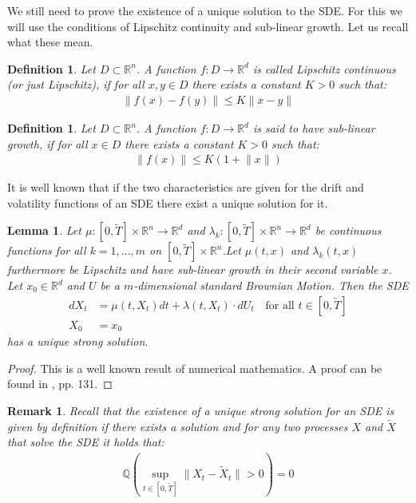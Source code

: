 \documentclass[12pt]{article}
\newtheorem{lemma}[theorem]{Lemma}
\newtheorem{remark}[theorem]{Remark}
\newtheorem{definition}[theorem]{Definition}
\begin{document}
	We still need to prove the existence of a unique solution to the SDE. For this we will use the conditions of Lipschitz continuity and sub-linear growth. Let us recall what these mean.
	\begin{definition}
		Let $D\subset \mathbb{R}^n$. A function $f: D \rightarrow \mathbb{R}^d$ is called Lipschitz continuous (or just Lipschitz), if for all $x, y\in D$ there exists a constant $K>0$ such that:
		\begin{align*}
			\lVert f(x) - f(y)\rVert \le K \lVert x - y\rVert
		\end{align*}
	\end{definition}
	\begin{definition}
		Let $D\subset \mathbb{R}^n$. A function $f: D \rightarrow \mathbb{R}^d$ is said to have \emph{sub-linear growth}, if for all $x\in D$ there exists a constant $K>0$ such that:
		\begin{align*}
			\lVert f(x)\rVert \le K\left(1 +  \lVert x\rVert\right)
		\end{align*}
	\end{definition}
	It is well known that if the two characteristics are given for the drift and volatility functions of an SDE there exist a unique solution for it.
	\begin{lemma}
		Let $\mu: \left[0,\tilde{T}\right]\times\mathbb{R}^n \rightarrow \mathbb{R}^d$ and $\lambda_k: \left[0,\tilde{T}\right]\times\mathbb{R}^n \rightarrow \mathbb{R}^d$ be continuous functions for all $k=1, ..., m$ on $\left[0,\tilde{T}\right]\times\mathbb{R}^n$.Let $\mu(t,x)$ and $\lambda_k(t,x)$ furthermore be Lipschitz and have sub-linear growth in their second variable $x$. Let $x_0\in \mathbb{R}^d$ and $U$ be a $m$-dimensional standard Brownian Motion. Then the SDE
		\begin{align*}
			dX_t &= \mu(t, X_t)dt + \lambda(t, X_t)\cdot dU_t \quad \text{for all } t \in \left[0, \tilde{T}\right]\\
			X_0&=x_0	
		\end{align*}
		has a unique strong solution.
	\end{lemma}
	\begin{proof}
		This is a well known result of numerical mathematics. A proof can be found in \cite{kloedenSchemes}, pp. 131.
	\end{proof}
	\begin{remark}
		Recall that the existence of a unique strong solution for an SDE is given by definition if there exists a solution and for any two processes $X$ and $\tilde{X}$ that solve the SDE it holds that:
		\begin{align*}
			\mathbb{Q}\left(\sup\limits_{t \in \left[0,\tilde{T}\right]}\lVert X_t - \tilde{X}_t\rVert  > 0\right) = 0
		\end{align*}
	\end{remark}
\end{document}
